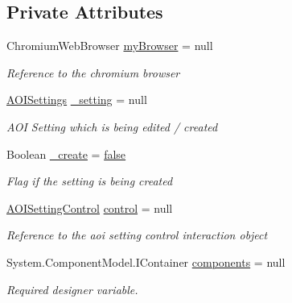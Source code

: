 \subsection*{Private Attributes}
\begin{DoxyCompactItemize}
\item 
Chromium\+Web\+Browser \hyperlink{class_web_analyzer_1_1_u_i_1_1_edit_a_o_i_setting_form_a358334bc4849d212f301f7d3caeab179}{my\+Browser} = null
\begin{DoxyCompactList}\small\item\em Reference to the chromium browser \end{DoxyCompactList}\item 
\hyperlink{class_web_analyzer_1_1_models_1_1_settings_model_1_1_a_o_i_settings}{A\+O\+I\+Settings} \hyperlink{class_web_analyzer_1_1_u_i_1_1_edit_a_o_i_setting_form_ae746fef4ad5f71f921e0b1b9cec61cb7}{\+\_\+setting} = null
\begin{DoxyCompactList}\small\item\em A\+O\+I Setting which is being edited / created \end{DoxyCompactList}\item 
Boolean \hyperlink{class_web_analyzer_1_1_u_i_1_1_edit_a_o_i_setting_form_ab015b083786c8c388a0b70b9e2174b45}{\+\_\+create} = \hyperlink{_u_i_2_h_t_m_l_resources_2js_2src_2export_8js_ae6c865df784842196d411c1466b01686}{false}
\begin{DoxyCompactList}\small\item\em Flag if the setting is being created \end{DoxyCompactList}\item 
\hyperlink{class_web_analyzer_1_1_u_i_1_1_interaction_objects_1_1_a_o_i_setting_control}{A\+O\+I\+Setting\+Control} \hyperlink{class_web_analyzer_1_1_u_i_1_1_edit_a_o_i_setting_form_a0b225becaa2adede20adbbc37c0263ee}{control} = null
\begin{DoxyCompactList}\small\item\em Reference to the aoi setting control interaction object \end{DoxyCompactList}\item 
System.\+Component\+Model.\+I\+Container \hyperlink{class_web_analyzer_1_1_u_i_1_1_edit_a_o_i_setting_form_a985bf45ba62ed1ac142143a2cf1abe1d}{components} = null
\begin{DoxyCompactList}\small\item\em Required designer variable. \end{DoxyCompactList}\end{DoxyCompactItemize}



